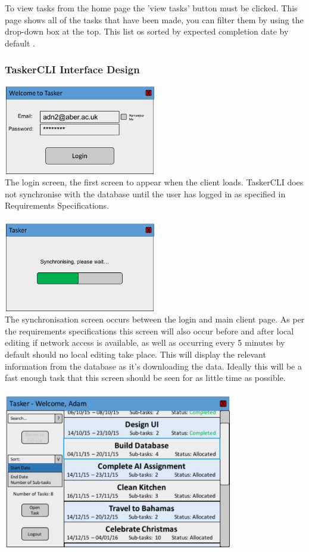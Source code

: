 \documentclass{project}
\begin{document}
To view tasks from the home page the 'view tasks' button must be clicked. This page shows all of the tasks that have been made, you can filter them by using the drop-down box at the top. This list os sorted by expected completion date by default \cite{se.qa.rs fr7}.
\subsubsection{TaskerCLI Interface Design} 
\includegraphics[width=0.5\textwidth, center]{images/5.2/TaskerCLILogin} \\
The login screen, the first screen to appear when the client loads. TaskerCLI does not synchronise with the database until the user has logged in as specified in Requirements Specifications.\cite{se.qa.rs fr8 user id} \\~\\
\newline
\includegraphics[width=0.5\textwidth, center]{images/5.2/TaskerCLILoading} \\
The synchronisation screen occurs between the login and main client page. As per the requirements specifications \cite{se.qa.rs fr11} this screen will also occur before and after local editing if network access is available, as well as occurring every 5 minutes by default should no local editing take place. This will display the relevant information from the database as it's downloading the data. Ideally this will be a fast enough task that this screen should be seen for as little time as possible. \\~\\
\newline
\includegraphics[width=0.75\textwidth, center]{images/5.2/TaskerCLIMainScreen} \\
\end{document}
